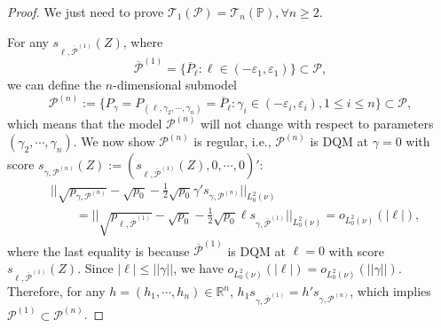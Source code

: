 \documentclass[12pt]{article}
\renewcommand{\(}{\left(}%
\renewcommand{\)}{\right)}%
\renewcommand{\[}{\left[}%
\renewcommand{\]}{\right]}%
\renewcommand{\r}{\mathbb{R}}
\newcommand{\ct}{\mathcal{T}}
\newcommand{\cp}{\mathcal{P}}
\newcommand{\p}{\mathbb{P}}
\newtheorem{proof}{Proof.}}
\begin{document}
\begin{proof}
	We just need to prove $\ct_1(\cp)=\ct_n(\p),\forall n\geq 2$. 
	
	For any $s_{\ell,\overline{\mathcal{P}}^{(1)}}(Z)$, where 
	\begin{equation*}
		\overline{\mathcal{P}}^{(1)}=\{\overline{ P}_\ell:\ell\in(-\varepsilon_1,\varepsilon_1)\}\subset\cp,
	\end{equation*}
	we can define the $n$-dimensional submodel 
	\begin{equation*}
		\mathcal{P}^{(n)}:=\{P_\gamma=P_{(\ell,\gamma_2,\cdots,\gamma_n)}= \overline{ P}_\ell:\gamma_i\in(-\varepsilon_i,\varepsilon_i),1\leq i\leq n\}\subset \mathcal{P},
	\end{equation*}
	which means that the model $\cp^{(n)}$ will not change with respect to parameters $(\gamma_2,\cdots,\gamma_n)$. We now show $\cp^{(n)}$ is regular, i.e., $\cp^{(n)}$ is DQM at $\gamma=0$ with score $s_{\gamma,\cp^{(n)}}(Z):=(s_{\ell,\overline{\mathcal{P}}^{(1)}}(Z),0,\cdots,0)'$:
	\begin{equation*}
		\begin{split}
			&||\sqrt{p_{\gamma,\cp^{(n)}}}-\sqrt{p_0}-\frac{1}{2}\sqrt{p_0}\gamma' s_{\gamma,\cp^{(n)}}||_{L^2_0(\nu)}\\
			&\qquad = ||\sqrt{p_{\ell,\overline{ \cp}^{(1)}}}-\sqrt{p_0}-\frac{1}{2}\sqrt{p_0}\ell s_{\gamma,\overline{\cp}^{(1)}}||_{L^2_0(\nu)}=o_{L^2_0(\nu)}(|\ell|),
		\end{split}
	\end{equation*}
	where the last equality is because $\overline{\mathcal{P}}^{(1)}$ is DQM at $\ell=0$ with score $s_{\ell,\overline{\mathcal{P}}^{(1)}}(Z)$. Since $|\ell|\leq ||\gamma||$, we have $o_{L^2_0(\nu)}(|\ell|)=o_{L^2_0(\nu)}(||\gamma||)$. Therefore, for any $h=(h_1,\cdots,h_n)\in\r^n$, $h_1s_{\gamma,\overline{\cp}^{(1)}}=h' s_{\gamma,\cp^{(n)}}$, which implies $\cp^{(1)}\subset \cp^{(n)}$.
	

\end{proof}
\end{document}
